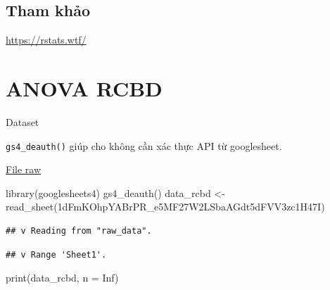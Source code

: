 \documentclass[
]{book}
\newenvironment{Shaded}{\begin{snugshade}}{\end{snugshade}}
\newcommand{\AttributeTok}[1]{\textcolor[rgb]{0.77,0.63,0.00}{#1}}
\newcommand{\ConstantTok}[1]{\textcolor[rgb]{0.00,0.00,0.00}{#1}}
\newcommand{\FunctionTok}[1]{\textcolor[rgb]{0.00,0.00,0.00}{#1}}
\newcommand{\NormalTok}[1]{#1}
\newcommand{\OtherTok}[1]{\textcolor[rgb]{0.56,0.35,0.01}{#1}}
\newcommand{\StringTok}[1]{\textcolor[rgb]{0.31,0.60,0.02}{#1}}
\theoremstyle{definition}
\theoremstyle{definition}
\theoremstyle{definition}
\theoremstyle{definition}
\theoremstyle{remark}
\begin{document}
\hypertarget{tham-khux1ea3o}{%
\section{Tham khảo}\label{tham-khux1ea3o}}

\url{https://rstats.wtf/}

\hypertarget{anova-rcbd}{%
\chapter{ANOVA RCBD}\label{anova-rcbd}}

Dataset \citep{somasegaran1985}

\texttt{gs4\_deauth()} giúp cho không cần xác thực API từ googlesheet.

\href{https://docs.google.com/spreadsheets/d/1VhF7aghi8ORJHoBd8XcZvJmUeVBUliQZurGIPMkekK0/edit?usp=sharing}{File raw}

\begin{Shaded}
\begin{Highlighting}[]
\FunctionTok{library}\NormalTok{(googlesheets4)}
\FunctionTok{gs4\_deauth}\NormalTok{()}
\NormalTok{data\_rcbd }\OtherTok{\textless{}{-}} \FunctionTok{read\_sheet}\NormalTok{(}\StringTok{\textquotesingle{}1dFmKOhpYABrPR\_e5MF27W2LSbaAGdt5dFVV3zc1H47I\textquotesingle{}}\NormalTok{)}
\end{Highlighting}
\end{Shaded}

\begin{verbatim}
## v Reading from "raw_data".
\end{verbatim}

\begin{verbatim}
## v Range 'Sheet1'.
\end{verbatim}

\begin{Shaded}
\begin{Highlighting}[]
\FunctionTok{print}\NormalTok{(data\_rcbd, }\AttributeTok{n =} \ConstantTok{Inf}\NormalTok{)}
\end{Highlighting}
\end{Shaded}
\end{document}
